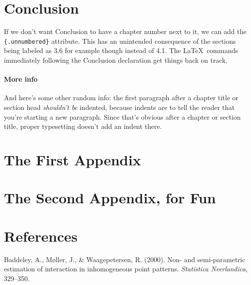 \documentclass[12pt,twoside]{reedthesis}
\begin{document}
  \chapter*{Conclusion}\label{conclusion}
  
  \setcounter{chapter}{4} \setcounter{section}{0}
  
  If we don't want Conclusion to have a chapter number next to it, we can
  add the \texttt{\{.unnumbered\}} attribute. This has an unintended
  consequence of the sections being labeled as 3.6 for example though
  instead of 4.1. The \LaTeX~commands immediately following the Conclusion
  declaration get things back on track.
  
  \subsubsection{More info}\label{more-info}
  
  And here's some other random info: the first paragraph after a chapter
  title or section head \emph{shouldn't be} indented, because indents are
  to tell the reader that you're starting a new paragraph. Since that's
  obvious after a chapter or section title, proper typesetting doesn't add
  an indent there.
  
  \appendix
  
  \chapter{The First Appendix}\label{the-first-appendix}
  
  \chapter{The Second Appendix, for
  Fun}\label{the-second-appendix-for-fun}
  
  \backmatter
  
  \chapter{References}\label{references}
  
  \noindent
  
  \setlength{\parindent}{-0.20in} \setlength{\leftskip}{0.20in}
  \setlength{\parskip}{8pt}
  
  Baddeley, A., M{ø}ller, J., \& Waagepetersen, R. (2000). Non- and
  semi-parametric estimation of interaction in inhomogeneous point
  patterns. \emph{Statistica Neerlandica}, 329--350.
  
\end{document}
